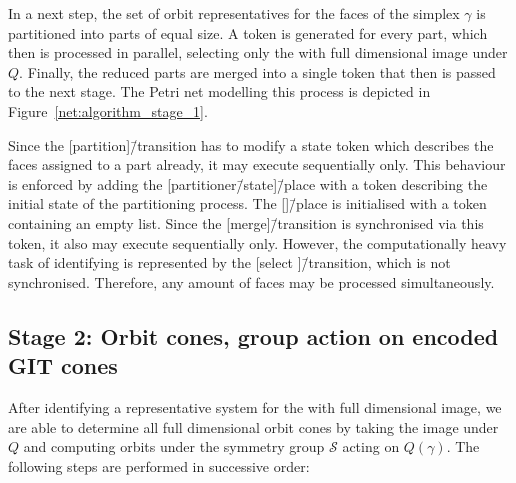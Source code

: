 In a next step, the set of orbit representatives for the faces of the simplex $\gamma$ is partitioned into parts of equal size. A token is generated for every part, which then is processed in parallel, selecting only the \afaces{} with full dimensional image under $Q$. Finally, the reduced parts are merged into a single token that then is passed to the next stage. The Petri net modelling this process is depicted in Figure~\ref{net:algorithm_stage_1}.

Since the [partition]\=/transition has to modify a state token which describes the faces assigned to a part already, it may execute sequentially only. This behaviour is enforced by adding the [partitioner\=/state]\=/place with a token describing the initial state of the partitioning process.
The [\afaces]\=/place is initialised with a token containing an empty list. Since the [merge]\=/transition is synchronised via this token, it also may execute sequentially only. However, the computationally heavy task of identifying \afaces{} is represented by the [select \afaces{}]\=/transition, which is not synchronised. Therefore, any amount of faces may be processed simultaneously.



\subsection*{Stage 2: Orbit cones, group action on encoded GIT cones}
After identifying a representative system for the \afaces{} with full dimensional image, we are able to determine all full dimensional orbit cones by taking the image under $Q$ and computing orbits under the symmetry group $\mathcal{S}$ acting on $Q(\gamma)$. The following steps are performed in successive order:

